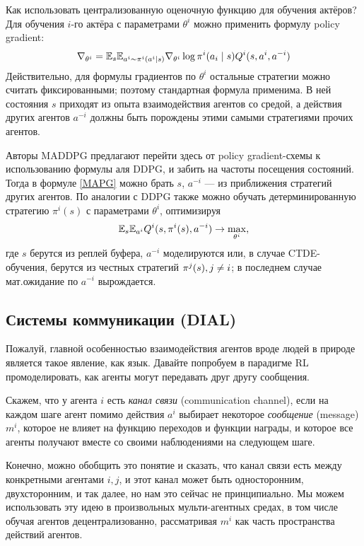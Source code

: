 Как использовать централизованную оценочную функцию для обучения актёров? Для обучения $i$-го актёра с параметрами $\theta^i$ можно применить формулу policy gradient:
\begin{equation}\label{MAPG}
\nabla_{\theta^i} = \E_{s} \E_{a^i \sim \pi^i(a^i \mid s)} \nabla_{\theta^i} \log \pi^i(a_i \HM\mid s) Q^i(s, a^i, a^{-i})
\end{equation}
Действительно, для формулы градиентов по $\theta^i$ остальные стратегии можно считать фиксированными; поэтому стандартная формула применима. В ней состояния $s$ приходят из опыта взаимодействия агентов со средой, а действия других агентов $a^{-i}$ должны быть порождены этими самыми стратегиями прочих агентов. 

Авторы MADDPG предлагают перейти здесь от policy gradient-схемы к использованию формулы аля DDPG, и забить на частоты посещения состояний. Тогда в формуле \eqref{MAPG} можно брать $s$, $a^{-i}$ --- из приближения стратегий других агентов. По аналогии с DDPG также можно обучать детерминированную стратегию $\pi^i(s)$ с параметрами $\theta^i$, оптимизируя
$$\mathbb{E}_{s} \mathbb{E}_{a^i} Q^i(s, \pi^i(s), a^{-i}) \to \max_{\theta^i},$$
где $s$ берутся из реплей буфера, $a^{-i}$ моделируются или, в случае CTDE-обучения, берутся из честных стратегий $\pi^j(s), j \HM\ne i$; в последнем случае мат.ожидание по $a^{-i}$ вырождается.

\subsection{Системы коммуникации (DIAL)}

Пожалуй, главной особенностью взаимодействия агентов вроде людей в природе является такое явление, как язык. Давайте попробуем в парадигме RL промоделировать, как агенты могут передавать друг другу сообщения.

\begin{definition}
Скажем, что у агента $i$ есть \emph{канал связи} (communication channel), если на каждом шаге агент помимо действия $a^i$ выбирает некоторое \emph{сообщение} (message) $m^i$, которое не влияет на функцию переходов и функции награды, и которое все агенты получают вместе со своими наблюдениями на следующем шаге.
\end{definition}

Конечно, можно обобщить это понятие и сказать, что канал связи есть между конкретными агентами $i, j$, и этот канал может быть односторонним, двухсторонним, и так далее, но нам это сейчас не принципиально. Мы можем использовать эту идею в произвольных мульти-агентных средах, в том числе обучая агентов децентрализованно, рассматривая $m^i$ как часть пространства действий агентов.

